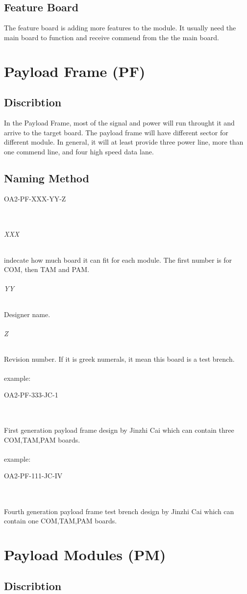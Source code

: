 \documentclass[12pt,article]{memoir}
\begin{document}
\section{Feature Board}%
The feature board is adding more features to the module. It usually need the main board to function and receive commend from the the main board.
\newpage
\chapter{Payload Frame (PF)}
\section{Discribtion}
In the Payload Frame, most of the signal and power will run throught it and arrive to the target board. The payload frame will have different sector for different module. In general, it will at least provide three power line, more than one commend line, and four high speed data lane.
\section{Naming Method}
\begin{LARGE}
OA2-PF-XXX-YY-Z
\end{LARGE}\\
\subparagraph{XXX}
indecate how much board it can fit for each module. The first number is for COM, then TAM and PAM.
\subparagraph{YY}
Designer name.
\subparagraph{Z}
Revision number. If it is greek numerals, it mean this board is a test brench.
\\\\
example: 
\begin{large}
OA2-PF-333-JC-1
\end{large}\\\\
First generation payload frame design by Jinzhi Cai which can contain three COM,TAM,PAM boards.\\\\
example: 
\begin{large}
OA2-PF-111-JC-IV
\end{large}\\\\
Fourth generation payload frame test brench design by Jinzhi Cai which can contain one COM,TAM,PAM boards.
\newpage
\chapter{Payload Modules (PM)}
\section{Discribtion}
\end{document}
